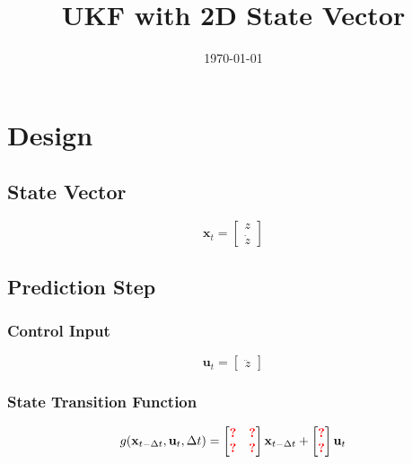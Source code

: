 \documentclass{article}
\title{UKF with 2D State Vector}
\author{\todo{Student name here}}
\date{\today}
\newcommand{\todo}[1]{\textcolor{red}{\textbf{#1}}}
\begin{document}
\maketitle

\section{Design}

\subsection{State Vector}

\begin{equation}
  \mathbf{x}_t=\begin{bmatrix}
  z \\
  \dot z
  \end{bmatrix}
\end{equation}

\subsection{Prediction Step}

\subsubsection{Control Input}

\begin{equation}
  \mathbf{u}_t = \begin{bmatrix}
  \ddot z
  \end{bmatrix}
\end{equation}

\subsubsection{State Transition Function}

\begin{equation}
  g(\mathbf{x}_{t-\Delta t}, \mathbf{u}_t, \Delta t) = \begin{bmatrix}
  \todo{?} & \todo{?} \\
  \todo{?} & \todo{?}
\end{bmatrix}\mathbf{x}_{t-\Delta t} + \begin{bmatrix}
  \todo{?} \\
  \todo{?}
  \end{bmatrix}\mathbf{u}_t
\end{equation}
\end{document}
